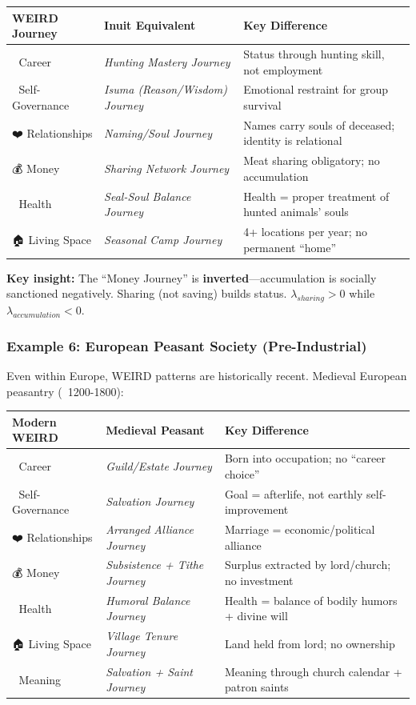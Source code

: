 {{{\begin{center}
\small
\begin{tabular}{@{}lll@{}}
\toprule
\textbf{WEIRD Journey} & \textbf{Inuit Equivalent} & \textbf{Key Difference} \\
\midrule
💼 Career & \textit{Hunting Mastery Journey} & Status through hunting skill, not employment \\
🧠 Self-Governance & \textit{Isuma (Reason/Wisdom) Journey} & Emotional restraint for group survival \\
❤️ Relationships & \textit{Naming/Soul Journey} & Names carry souls of deceased; identity is relational \\
💰 Money & \textit{Sharing Network Journey} & Meat sharing obligatory; no accumulation \\
🏥 Health & \textit{Seal-Soul Balance Journey} & Health = proper treatment of hunted animals' souls \\
🏠 Living Space & \textit{Seasonal Camp Journey} & 4+ locations per year; no permanent ``home'' \\
\bottomrule
\end{tabular}
\end{center}

\textbf{Key insight:} The ``Money Journey'' is \textbf{inverted}---accumulation is socially sanctioned negatively. Sharing (not saving) builds status. $\lambda_{sharing} > 0$ while $\lambda_{accumulation} < 0$.

\subsubsection{Example 6: European Peasant Society (Pre-Industrial)}

Even within Europe, WEIRD patterns are historically recent. Medieval European peasantry (~1200-1800):

\begin{center}
\small
\begin{tabular}{@{}lll@{}}
\toprule
\textbf{Modern WEIRD} & \textbf{Medieval Peasant} & \textbf{Key Difference} \\
\midrule
💼 Career & \textit{Guild/Estate Journey} & Born into occupation; no ``career choice'' \\
🧠 Self-Governance & \textit{Salvation Journey} & Goal = afterlife, not earthly self-improvement \\
❤️ Relationships & \textit{Arranged Alliance Journey} & Marriage = economic/political alliance \\
💰 Money & \textit{Subsistence + Tithe Journey} & Surplus extracted by lord/church; no investment \\
🏥 Health & \textit{Humoral Balance Journey} & Health = balance of bodily humors + divine will \\
🏠 Living Space & \textit{Village Tenure Journey} & Land held from lord; no ownership \\
🧭 Meaning & \textit{Salvation + Saint Journey} & Meaning through church calendar + patron saints \\
\bottomrule
\end{tabular}
\end{center}

}}}
